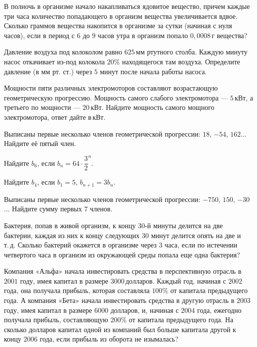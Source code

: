 \begin{class}[number=2]
\begin{listofex}
		\item В полночь в организме начало накапливаться ядовитое вещество, причем каждые три часа количество попадающего в организм вещества увеличивается вдвое. Сколько граммов вещества накопится в организме за сутки (начиная с нуля часов), если в период с \( 6 \) до \( 9 \) часов утра в организм попало \( 0,0008 \) г вещества?
		\item Давление воздуха под колоколом равно \( 625 \) мм ртутного столба. Каждую минуту насос откачивает из-под колокола \( 20\% \) находящегося там воздуха. Определите давление (в мм рт. ст.) через \( 5 \) минут после начала работы насоса.
		\item Мощности пяти различных электромоторов составляют возрастающую геометрическую прогрессию. Мощность самого слабого электромотора --- \( 5 \) кВт, а третьего по мощности --- \( 20 \) кВт. Найдите мощность самого мощного электромотора, ответ дайте в кВт.
	\end{listofex}
\end{class}

\begin{homework}[number=1]
	\begin{listofex}
		\item Выписаны первые несколько членов геометрической прогрессии: \( 18 \), \( -54 \), \( 162 \)... Найдите её пятый член.
		\item Найдите \( b_6 \), \quad если \( b_n=64\cdot\dfrac{3}{2}^n \).
		\item Найдите \( b_4 \), \quad если \( b_1=5	\), \( b_{n+1}=3b_n \).
		\item Выписаны первые несколько членов геометрической прогрессии: \( -750 \), \( 150 \), \( -30 \)... Найдите сумму первых \( 7 \) членов.
		\item Бактерия, попав в живой организм, к концу \( 30 \)-й минуты делится на две бактерии, каждая из них к концу следующих \( 30 \) минут делится опять на две и т. д. Сколько бактерий окажется в организме через \( 3 \) часа, если по истечении четвертого часа в организм из окружающей среды попала еще одна бактерия?
		\item Компания «Альфа» начала инвестировать средства в перспективную отрасль в \( 2001 \) году, имея капитал в размере \( 3000 \) долларов. Каждый год, начиная с \( 2002 \) года, она получала прибыль, которая составляла \( 100\% \) от капитала предыдущего года. А компания «Бета» начала инвестировать средства в другую отрасль в \( 2003 \) году, имея капитал в размере \( 6000 \) долларов, и, начиная с \( 2004 \) года, ежегодно получала прибыль, составляющую \( 200\% \) от капитала предыдущего года. На сколько долларов капитал одной из компаний был больше капитала другой к концу \( 2006 \) года, если прибыль из оборота не изымалась?
	\end{listofex}
\end{homework}

